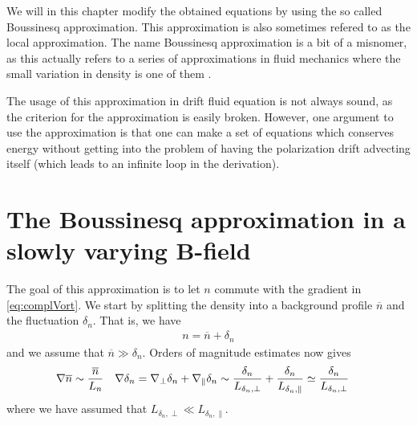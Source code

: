 We will in this chapter modify the obtained equations by using the so called Boussinesq approximation.
This approximation is also sometimes refered to as the local approximation.
The name Boussinesq approximation is a bit of a misnomer, as this actually refers to a series of approximations in fluid mechanics where the small variation in density is one of them \cite{Kundu2010book}.

The usage of this approximation in drift fluid equation is not always sound, as the criterion for the approximation is easily broken.
However, one argument to use the approximation is that one can make a set of equations which conserves energy without getting into the problem of having the polarization drift advecting itself (which leads to an infinite loop in the derivation).

\section{The Boussinesq approximation in a slowly varying B-field}
\label{sec:boussinesq}
%
The goal of this approximation is to let $n$ commute with the gradient in \cref{eq:complVort}.
We start by splitting the density into a background profile $\overline{n}$ and the fluctuation $\delta_n$.
That is, we have
%
\begin{align*}
    n = \overline{n} + \delta_n
\end{align*}
%
%
%
and we assume that $\overline{n} \gg \delta_n$.
%
Orders of magnitude estimates now gives
%
\begin{align*}
    &\nabla \overline{n} \sim \frac{\overline{n}}{L_n}&
    &\nabla \delta_n
    =
    \nabla_\perp \delta_n + \nabla_\| \delta_n
    \sim \frac{\delta_n}{L_{\delta_n, \perp}} + \frac{\delta_n}{L_{\delta_n, \|}}
    \simeq \frac{\delta_n}{L_{\delta_n, \perp}}
    &
\end{align*}
%
where we have assumed that $L_{\delta_n, \perp} \ll L_{\delta_n, \|}$.


